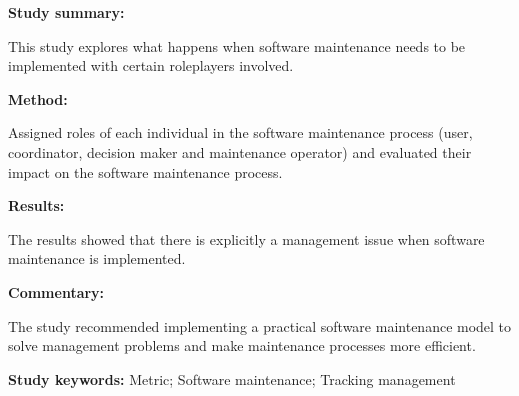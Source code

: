 \begin{tcolorbox}[colback=gray!5!white, colframe=pastelgreen!40!black, title=Metric-based tracking management in software maintenance\cite{Tang2010}]
	\begin{minipage}[t]{0.25\textwidth}
		\textbf{Study summary:}
	\end{minipage}
	\hfill
	\begin{minipage}[t]{0.65\textwidth}
		This study explores what happens when software maintenance needs to be implemented with certain roleplayers involved.
	\end{minipage}

	\vspace{0.75em} 

	\begin{minipage}[t]{0.25\textwidth}
		\textbf{Method:}
	\end{minipage}
	\hfill
	\begin{minipage}[t]{0.65\textwidth}
		Assigned roles of each individual in the software maintenance process (user, coordinator, decision maker and maintenance operator) and evaluated their impact on the software maintenance process. 
	\end{minipage}

	\vspace{0.75em} 

	\begin{minipage}[t]{0.25\textwidth}
		\textbf{Results:}
	\end{minipage}
	\hfill
	\begin{minipage}[t]{0.65\textwidth}
		The results showed that there is explicitly a management issue when software maintenance is implemented. 
	\end{minipage}

	\vspace{0.75em} 

	\begin{minipage}[t]{0.25\textwidth}
		\textbf{Commentary:}
	\end{minipage}
	\hfill
	\begin{minipage}[t]{0.65\textwidth}
		The study recommended implementing a practical software maintenance model to solve management problems and make maintenance processes more efficient.
	\end{minipage}
	\tcblower
	\textbf{Study keywords:} Metric; Software maintenance; Tracking management
\end{tcolorbox}

